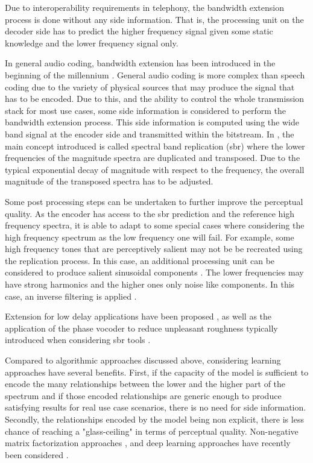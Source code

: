 \documentclass{article}
\begin{document}
Due to interoperability requirements in telephony, the bandwidth extension process is done without any side information. That is, the processing unit on the decoder side has to predict the higher frequency signal given some static knowledge and the lower frequency signal only.

In general audio coding, bandwidth extension has been introduced in the beginning of the millennium \cite{dietz2002spectral}. General audio coding is more complex than speech coding due to the variety of physical sources that may produce the signal that has to be encoded. Due to this, and the ability to control the whole transmission stack for most use cases, some side information is considered to perform the bandwidth extension process. This side information is computed using the wide band signal at the encoder side and transmitted within the bitstream. In \cite{dietz2002spectral}, the main concept introduced is called spectral band replication (sbr) where the lower frequencies of the magnitude spectra are duplicated and transposed. Due to the typical exponential decay of magnitude with respect to the frequency, the overall magnitude of the transposed spectra has to be adjusted.

Some post processing steps can be undertaken to further improve the perceptual quality. As the encoder has access to the sbr prediction and the reference high frequency spectra, it is able to adapt to some special cases where considering the high frequency spectrum as the low frequency one will fail. For example,  some high frequency tones that are perceptively salient may not be be recreated using the replication process. In this case, an additional processing unit can be considered to produce salient sinusoidal components \cite{ekstrand2002bandwidth}. The lower frequencies may have strong harmonics and the higher ones only noise like components. In this case, an inverse filtering is applied \cite{ehret2004audio}.

Extension for low delay applications have been proposed \cite{friedrich2007spectral}, as well as the application of the phase vocoder \cite{flanagan1966phase} to reduce unpleasant roughness typically introduced when considering sbr tools \cite{nagel2009harmonic}.

Compared to algorithmic approaches discussed above, considering learning approaches have several benefits. First, if the capacity of the model is sufficient to encode the many relationships between the lower and the higher part of the spectrum and if those encoded relationships are generic enough to produce satisfying results for real use case scenarios, there is no need for side information. Secondly, the relationships encoded by the model being non explicit, there is less chance of reaching a "glass-ceiling" in terms of perceptual quality. Non-negative matrix factorization approaches \cite{sun2013non},  and deep learning approaches have recently been considered \cite{miron2018high}.
\end{document}

